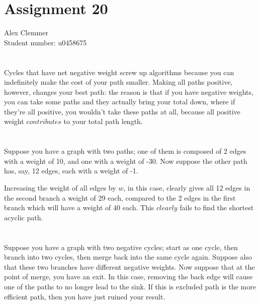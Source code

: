 \documentclass[a4paper]{article}
\begin{document}
\section*{Assignment 20}
Alex Clemmer\\
Student number: u0458675

\section{}

Cycles that have net negative weight screw up algorithms because you can indefinitely make the cost of your path smaller. Making all paths positive, however, changes your best path: the reason is that if you have negative weights, you can take some paths and they actually bring your total down, where if they're all positive, you wouldn't take these paths at all, because all positive weight $\textit{contributes}$ to your total path length.

\section{}

Suppose you have a graph with two paths; one of them is composed of 2 edges with a weight of 10, and one with a weight of -30. Now suppose the other path has, say, 12 edges, each with a weight of -1.

Increasing the weight of all edges by $w$, in this case, clearly gives all 12 edges in the second branch a weight of 29 each, compared to the 2 edges in the first branch which will have a weight of 40 each. This $\textit{clearly}$ fails to find the shortest acyclic path.

\section{}

Suppose you have a graph with two negative cycles; start as one cycle, then branch into two cycles, then merge back into the same cycle again. Suppose also that these two branches have different negative weights. Now suppose that at the point of merge, you have an exit. In this case, removing the back edge will cause one of the paths to no longer lead to the sink. If this is excluded path is the more efficient path, then you have just ruined your result.
\end{document}

